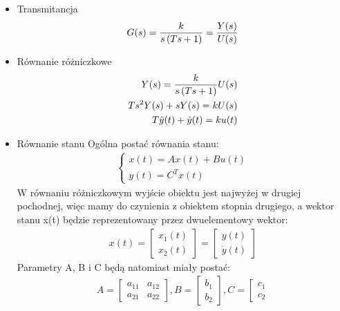 \documentclass[a4paper,10pt]{article}
\begin{document}
\begin{itemize}
\begin{itemize}
\item Transmitancja	
	\begin{eqnarray}
		G(s)= {k \over {s \left( Ts + 1 \right) }} = {Y(s) \over U(s)}
	\end{eqnarray}
\item Równanie różniczkowe
	\begin{eqnarray} 
		\nonumber Y(s) = {k \over {s \left( Ts + 1 \right) }} U(s)\\ \label{eq:calk_rozn}
		\nonumber Ts^{2}Y(s) + sY(s) = kU(s)\\
		T\ddot{y}(t) + \dot{y}(t) = ku(t)
	\end{eqnarray}
\item Równanie stanu
\newline Ogólna postać równania stanu:
	\begin{eqnarray}
		\nonumber \left\{
			\begin{array}{l}
				x(t) = Ax(t) + Bu(t)\\
				y(t) = C^{T}x(t)
			\end{array} \right.
	\end{eqnarray}
W równaniu różniczkowym wyjście obiektu jest najwyżej w drugiej pochodnej, więc mamy do czynienia z obiektem stopnia drugiego, a wektor stanu x(t) będzie reprezentowany przez dwuelementowy wektor:
 	\begin{eqnarray}
		\nonumber x(t) = \left[ 
			\begin{array}{l}x_{1}(t)\\
				x_{2}(t)
			\end{array}
		\right] = \left[ 
			\begin{array}{l}
				y(t)\\
				\dot{y}(t)
			\end{array}
		\right]
	\end{eqnarray}
Parametry A, B i C będą natomiast miały postać:
	\begin{eqnarray}
		\nonumber A = \left[ 
			\begin{array}{ll}
				a_{11} & a_{12}\\
				a_{21} & a_{22}
			\end{array}
		\right], B = \left[ 
			\begin{array}{l}
				b_{1}\\
				b_{2}
			\end{array}
		\right], C = \left[ 
			\begin{array}{l}
				c_{1}\\
				c_{2}

\end{array}
\end{eqnarray}
\end{itemize}
\end{itemize}
\end{document}
